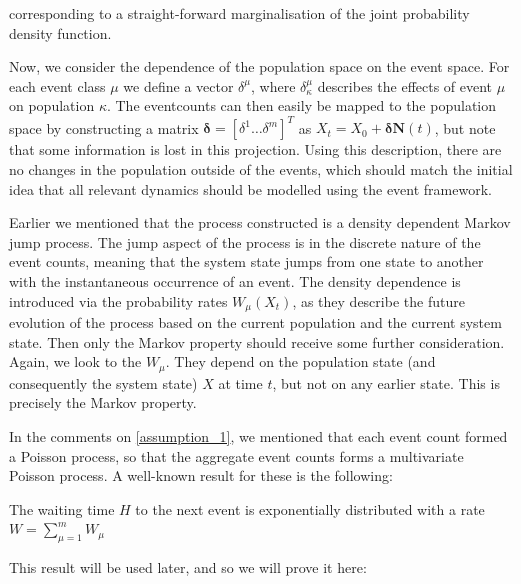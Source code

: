 \documentclass[10pt,a4paper]{article}
\begin{document}
corresponding to a straight-forward marginalisation of the joint probability density function.

Now, we consider the dependence of the population space on the event space. For each event class $\mu$ we define a vector $\delta^\mu$, where $\delta^\mu_\kappa$ describes the effects of event $\mu$ on population $\kappa$. The eventcounts can then easily be mapped to the population space by constructing a matrix $\bm{\delta} = \left[ \delta^1 \ldots \delta^m \right]^{T}$ as $X_t = X_0 + \bm{\delta} \bm{N} \left( t \right)$, but note that some information is lost in this projection. Using this description, there are no changes in the population outside of the events, which should match the initial idea that all relevant dynamics should be modelled using the event framework.


Earlier we mentioned that the process constructed is a density dependent Markov jump process. The jump aspect of the process is in the discrete nature of the event counts, meaning that the system state jumps from one state to another with the instantaneous occurrence of an event. The density dependence is introduced via the probability rates $W_\mu \left( X_t\right)$, as they describe the future evolution of the process based on the current population and the current system state. Then only the Markov property should receive some further consideration. Again, we look to the $W_\mu$. They depend on the population state (and consequently the system state) $X$ at time $t$, but not on any earlier state. This is precisely the Markov property.

In the comments on \cref{assumption_1}, we mentioned that each event count formed a Poisson process, so that the aggregate event counts forms a multivariate Poisson process. A well-known result for these is the following:

\begin{lemma} \label{lemma:exponential}
	The waiting time $H$ to the next event is exponentially distributed with a rate $W = \sum_{\mu=1}^m W_\mu$
\end{lemma}

This result will be used later, and so we will prove it here:
\end{document}
